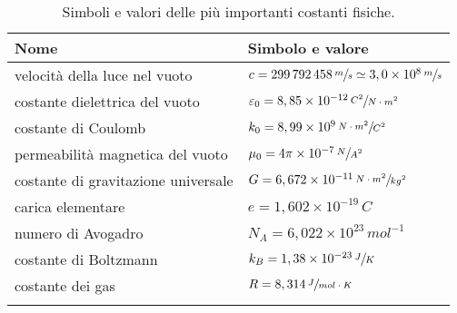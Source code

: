 \documentclass[a4paper,11pt,italian]{article}
\begin{document}
\begin{description}
  \begin{table}[htp]\centering
    \begin{tabular}{ll}\toprule
      \textbf{Nome} & \textbf{Simbolo e valore}\\\midrule
      velocità della luce nel vuoto & $ c = 299\,  792\, 458\,	\sfrac{m}{s} \simeq 3,0 \times 10^8 \,	\sfrac{m}{s} $ \\\addlinespace[.2em]
      costante dielettrica del vuoto & $ \varepsilon_0 = 8,85\times 10^{-12} \, \sfrac{C^2}{N \cdot m^2} $ \\\addlinespace[.2em]
      costante di Coulomb & $ k_0 = 8,99 \times 10^9 \, \sfrac{N \cdot m^2}{C^2} $ \\\addlinespace[.2em]
      permeabilità magnetica del vuoto & $ \mu_0 = 4\pi \times 10^{-7} \, \sfrac{N}{A^2} $ \\\addlinespace[.2em]
      costante di gravitazione universale & $ G = 6,672 \times 10^{-11} \, \sfrac{N \cdot m^2}{kg^2} $ \\\addlinespace[.2em]
      carica elementare & $ e = 1,602 \times 10^{-19} \, C $ \\\addlinespace[.2em]
      numero di Avogadro & $ N_A = 6,022 \times 10^{23} \, mol^{-1} $ \\\addlinespace[.2em]
      costante di Boltzmann & $ k_B = 1,38 \times 10^{-23} \, \sfrac{J}{K} $ \\\addlinespace[.2em]
      costante dei gas & $ R = 8,314 \, \sfrac{J}{mol \cdot K} $ \\\addlinespace[.2em]
    \end{tabular}
  \caption{Simboli e valori delle più importanti costanti fisiche.}
    \label{tab:costantimportanti}
  \end{table}  
%


\end{description}
\end{document}
